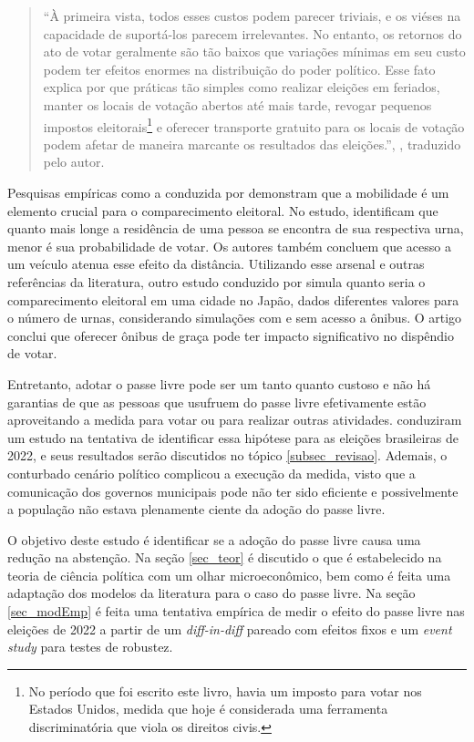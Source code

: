 \begin{quote}
  ``À primeira vista, todos esses custos podem parecer triviais, e os viéses na capacidade de suportá-los parecem irrelevantes. No entanto, os retornos do ato de votar geralmente são tão baixos que variações mínimas em seu custo podem ter efeitos enormes na distribuição do poder político. Esse fato explica por que práticas tão simples como realizar eleições em feriados, manter os locais de votação abertos até mais tarde, revogar pequenos impostos eleitorais\footnote{No período que foi escrito este livro, havia um imposto para votar nos Estados Unidos, medida que hoje é considerada uma ferramenta discriminatória que viola os direitos civis.} 
  e oferecer transporte gratuito para os locais de votação podem afetar de maneira marcante os resultados das eleições.'', \textcite{downs1957economic}, traduzido pelo autor.
\end{quote}

Pesquisas empíricas como a conduzida por \textcite{haspel2005location} demonstram que a mobilidade é um elemento crucial para o comparecimento eleitoral. No estudo, identificam que quanto mais longe a residência de uma pessoa se encontra de sua respectiva urna, menor é sua probabilidade de votar. Os autores também concluem que acesso a um veículo atenua esse efeito da distância. Utilizando esse arsenal e outras referências da literatura, outro estudo conduzido por \textcite{konishi2010examination} simula quanto seria o comparecimento eleitoral em uma cidade no Japão, dados diferentes valores para o número de urnas, considerando simulações com e sem acesso a ônibus. O artigo conclui que oferecer ônibus de graça pode ter impacto significativo no dispêndio de votar.

Entretanto, adotar o passe livre pode ser um tanto quanto custoso e não há garantias de que as pessoas que usufruem do passe livre efetivamente estão aproveitando a medida para votar ou para realizar outras atividades. \textcite{pereira2023transporte} conduziram um estudo na tentativa de identificar essa hipótese para as eleições brasileiras de 2022, e seus resultados serão discutidos no tópico \ref{subsec_revisao}. Ademais, o conturbado cenário político complicou a execução da medida, visto que a comunicação dos governos municipais pode não ter sido eficiente e possivelmente a população não estava plenamente ciente da adoção do passe livre. 

O objetivo deste estudo é identificar se a adoção do passe livre causa uma redução na abstenção. Na seção \ref{sec_teor} é discutido o que é estabelecido na teoria de ciência política com um olhar microeconômico, bem como é feita uma adaptação dos modelos da literatura para o caso do passe livre. Na seção \ref{sec_modEmp} é feita uma tentativa empírica de medir o efeito do passe livre nas eleições de 2022 a partir de um \textit{diff-in-diff} pareado com efeitos fixos e um \textit{event study} para testes de robustez.

